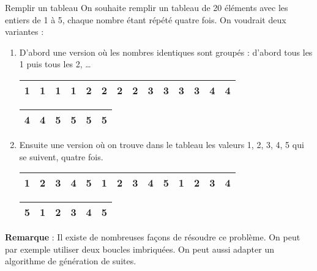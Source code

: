	\begin{Exercice}{Remplir un tableau}
		On souhaite remplir un tableau de 20 éléments avec
		les entiers de 1 à 5, chaque nombre étant répété quatre fois.
		On voudrait deux variantes :
		\begin{enumerate}[label=\alph*)]
		\item
			D'abord une version
			où les nombres identiques sont groupés :
			d'abord tous les 1 puis tous les 2, \dots
			
			\begin{tabular}{|c|c|c|c|c|c|c|c|c|c|c|c|c|c|}
			\hline
			1 & 1 & 1 & 1 & 2 & 2 & 2 & 2 & 3 & 3 & 3 & 3 & 4 & 4 \\
			\hline
			\end{tabular}
			\begin{flushright}
			\par\hspace{3cm}
			\begin{tabular}{|c|c|c|c|c|c|}
			\hline
			4 & 4 & 5 & 5 & 5 & 5\\
			\hline
			\end{tabular}
			\end{flushright}
		\item
			Ensuite une version où on trouve dans le tableau
			les valeurs 1, 2, 3, 4, 5 qui se suivent, quatre fois.
			
			\begin{tabular}{|c|c|c|c|c|c|c|c|c|c|c|c|c|c|}
			\hline
			1 & 2 & 3 & 4 & 5 & 1 & 2 & 3 & 4 & 5 & 1 & 2 & 3 & 4 \\ 
			\hline
			\end{tabular}
			\begin{flushright}
			\par\hspace{3cm}
			\begin{tabular}{|c|c|c|c|c|c|}
			\hline
			5 & 1 & 2 & 3 & 4 & 5 \\
			\hline
			\end{tabular}
			\end{flushright}
		\end{enumerate}
		\smallskip
		\textbf{Remarque} : 
		Il existe de nombreuses façons de résoudre ce problème.
		On peut par exemple utiliser deux boucles imbriquées.
		On peut aussi adapter un algorithme de génération de suites.
	\end{Exercice}
	
